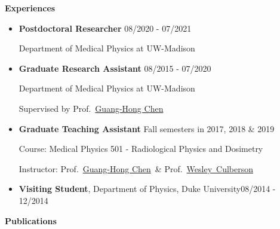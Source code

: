 \documentclass[letterpaper,11pt]{article}
\newcommand{\resheading}[1]{{\large \colorbox{mygrey}{\begin{minipage}{\textwidth}{\textbf{#1 \vphantom{p\^{E}}}}\end{minipage}}}}
\newcommand{\profchen}{Prof.~\href{https://www.medphysics.wisc.edu/blog/staff/chen-guanghong/} {Guang-Hong Chen}}
\newcommand{\profculberson}{Prof.~\href{https://www.medphysics.wisc.edu/blog/staff/culberson-wesley/} {Wesley~Culberson}}
\begin{document}
\resheading{Experiences}
\begin{itemize}
\item \textbf{Postdoctoral Researcher}\cftdotfill{\cftdotsep} 08/2020 - 07/2021

Department of Medical Physics at UW-Madison

\item \textbf{Graduate Research Assistant}\cftdotfill{\cftdotsep} 08/2015 - 07/2020

Department of Medical Physics at UW-Madison

Supervised by \profchen
\item \textbf{Graduate Teaching Assistant} \cftdotfill{\cftdotsep} Fall semesters in 2017,  2018 \& 2019

Course: Medical Physics 501 - Radiological Physics and Dosimetry

Instructor: \profchen~\& \profculberson
	 \item \textbf{Visiting Student}, Department of Physics, Duke University\cftdotfill{\cftdotsep}08/2014 - 12/2014
\end{itemize}
\resheading{Publications}
\end{document}
